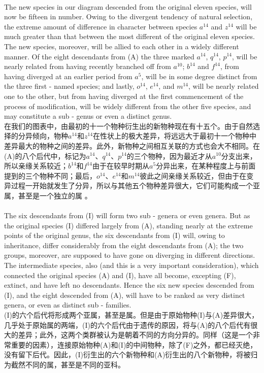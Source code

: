 \documentclass{article}
\begin{document}
\\
The new species in our diagram descended from the original eleven species, will now be fifteen in number. Owing to the divergent tendency of natural selection, the extreme amount of difference in character between species $a^{14}$ and $z^{14}$ will be much greater than that between the most different of the original eleven species. The new species, moreover, will be allied to each other in a widely different manner. Of the eight descendants from (A) the three marked $a^{14}$, $q^{14}$, $p^{14}$, will be nearly related from having recently branched off from $a^{10}$; $b^{14}$ and $f^{14}$, from having diverged at an earlier period from $a^{5}$, will be in some degree distinct from the three first - named species; and lastly, $o^{14}$, $e^{14}$, and $m^{14}$, will be nearly related one to the other, but from having diverged at the first commencement of the process of modification, will be widely different from the other five species, and may constitute a sub - genus or even a distinct genus.\\
在我们的图表中，由最初的十一个物种衍生出的新物种现在有十五个。由于自然选择的分异倾向，物种$a^{14}$和$z^{14}$在性状上的极大差异，将远远大于最初十一个物种中差异最大的物种之间的差异。此外，新物种之间相互关联的方式也会大不相同。在(A)的八个后代中，标记为$a^{14}$、$q^{14}$、$p^{14}$的三个物种，因为最近才从$a^{10}$分支出来，所以亲缘关系较近；$b^{14}$和$f^{14}$由于在较早时期从$a^{5}$分异出来，在某种程度上与前面提到的三个物种不同；最后，$o^{14}$、$e^{14}$和$m^{14}$彼此之间亲缘关系较近，但由于在变异过程一开始就发生了分异，所以与其他五个物种差异很大，它们可能构成一个亚属，甚至是一个独立的属 。 \\

\\
The six descendants from (I) will form two sub - genera or even genera. But as the original species (I) differed largely from (A), standing nearly at the extreme points of the original genus, the six descendants from (I) will, owing to inheritance, differ considerably from the eight descendants from (A); the two groups, moreover, are supposed to have gone on diverging in different directions. The intermediate species, also (and this is a very important consideration), which connected the original species (A) and (I), have all become, excepting (F), extinct, and have left no descendants. Hence the six new species descended from (I), and the eight descended from (A), will have to be ranked as very distinct genera, or even as distinct sub - families.\\
(I)的六个后代将形成两个亚属，甚至是属。但是由于原始物种(I)与(A)差异很大，几乎处于原始属的两端，(I)的六个后代由于遗传的原因，将与(A)的八个后代有很大的差异；此外，这两个类群被认为是朝着不同的方向分异的。同样（这是一个非常重要的因素），连接原始物种(A)和(I)的中间物种，除了(F)之外，都已经灭绝，没有留下后代。因此，(I)衍生出的六个新物种和(A)衍生出的八个新物种，将被归为截然不同的属，甚至是不同的亚科。 \\
\end{document}

